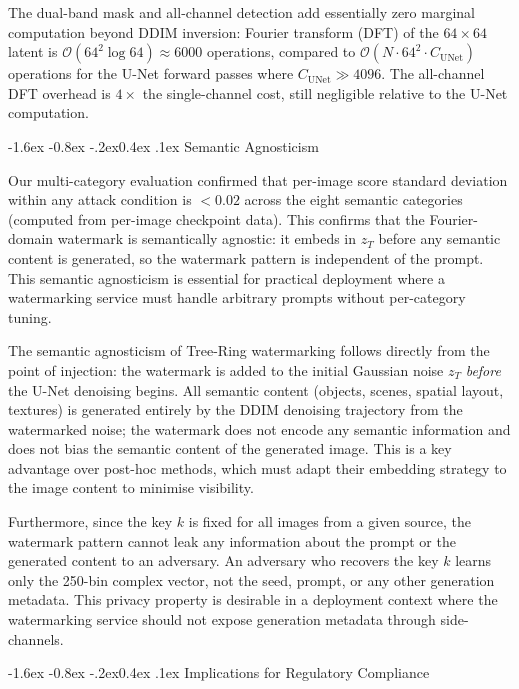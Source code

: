 \documentclass[10pt,twocolumn]{article}
\makeatletter
\renewcommand\subsection{\@startsection{subsection}{2}{\z@}%
  {-1.6ex \@plus -0.8ex \@minus -.2ex}{0.4ex \@plus .1ex}%
  {\normalfont\normalsize\itshape}}
\makeatother
\begin{document}
The dual-band mask and all-channel detection add essentially zero
marginal computation beyond DDIM inversion: Fourier transform (DFT)
of the $64{\times}64$ latent is $\mathcal{O}(64^2 \log 64) \approx 6000$
operations, compared to $\mathcal{O}(N \cdot 64^2 \cdot C_{\mathrm{UNet}})$
operations for the U-Net forward passes where
$C_{\mathrm{UNet}} \gg 4096$.
The all-channel DFT overhead is $4\times$ the single-channel cost,
still negligible relative to the U-Net computation.

\subsection{Semantic Agnosticism}

Our multi-category evaluation confirmed that per-image score standard
deviation within any attack condition is $< 0.02$ across the eight
semantic categories (computed from per-image checkpoint data).
This confirms that the Fourier-domain watermark is semantically
agnostic: it embeds in $z_T$ before any semantic content is generated,
so the watermark pattern is independent of the prompt.
This semantic agnosticism is essential for practical deployment
where a watermarking service must handle arbitrary prompts without
per-category tuning.

The semantic agnosticism of Tree-Ring watermarking follows directly
from the point of injection: the watermark is added to the initial
Gaussian noise $z_T$ \emph{before} the U-Net denoising begins.
All semantic content (objects, scenes, spatial layout, textures) is
generated entirely by the DDIM denoising trajectory from the watermarked
noise; the watermark does not encode any semantic information and does
not bias the semantic content of the generated image.
This is a key advantage over post-hoc methods, which must adapt their
embedding strategy to the image content to minimise visibility.

Furthermore, since the key $k$ is fixed for all images from a given
source, the watermark pattern cannot leak any information about the
prompt or the generated content to an adversary.
An adversary who recovers the key $k$ learns only the 250-bin complex
vector, not the seed, prompt, or any other generation metadata.
This privacy property is desirable in a deployment context where the
watermarking service should not expose generation metadata through
side-channels.

\subsection{Implications for Regulatory Compliance}
\end{document}
